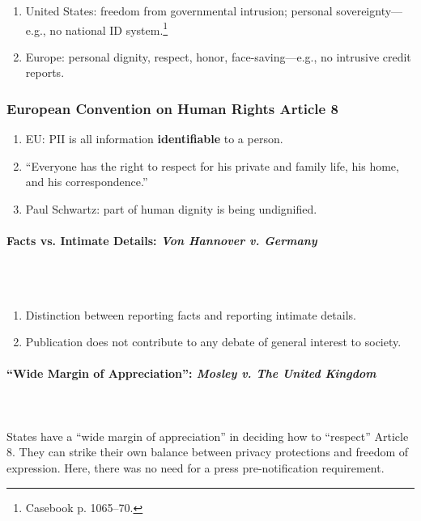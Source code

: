 \begin{enumerate}
    \item United States: freedom from governmental intrusion; personal 
    sovereignty---e.g., no national ID system.\footnote{Casebook p. 1065--70.}
    \item Europe: personal dignity, respect, honor, face-saving---e.g., no 
    intrusive credit reports.
\end{enumerate}

\subsubsection{European Convention on Human Rights Article 8}

\begin{enumerate}
    \item EU: PII is all information \textbf{identifiable} to a person.
    \item ``Everyone has the right to respect for his private and family life, 
    his home, and his correspondence.''
    \item Paul Schwartz: part of human dignity is being undignified.
\end{enumerate}

\paragraph{Facts vs. Intimate Details: \emph{Von Hannover v. Germany}}
~\\\\
\begin{enumerate}
    \item Distinction between reporting facts and reporting intimate details.
    \item Publication does not contribute to any debate of general interest to 
    society.
\end{enumerate}

\paragraph{``Wide Margin of Appreciation'': \emph{Mosley v. The United 
Kingdom}}
~\\\\
States have a ``wide margin of appreciation'' in deciding how to ``respect'' 
Article 8. They can strike their own balance between privacy protections and 
freedom of expression. Here, there was no need for a press pre-notification 
requirement.

